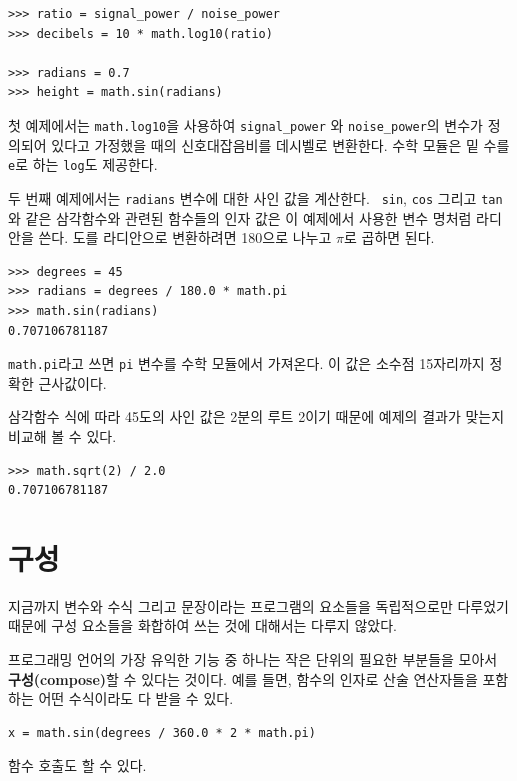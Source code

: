 \documentclass[10pt]{book}
\begin{document}
\begin{verbatim}
>>> ratio = signal_power / noise_power
>>> decibels = 10 * math.log10(ratio)

>>> radians = 0.7
>>> height = math.sin(radians)
\end{verbatim}
%
첫 예제에서는 \verb"math.log10"을 사용하여 \verb"signal_power" 와
\verb"noise_power"의 변수가 정의되어 있다고 가정했을 때의 신호대잡음비를
데시벨로 변환한다.  수학 모듈은 밑 수를 {\tt e}로 하는 {\tt log}도 제공한다. 

두 번째 예제에서는 {\tt radians} 변수에 대한 사인 값을 계산한다.  {\tt
  sin}, {\tt cos} 그리고 {\tt tan}와 같은 삼각함수와 관련된 함수들의
인자 값은 이 예제에서 사용한 변수 명처럼 라디안을 쓴다.  도를
라디안으로 변환하려면 180으로 나누고 $\pi$로 곱하면 된다.


\begin{verbatim}
>>> degrees = 45
>>> radians = degrees / 180.0 * math.pi
>>> math.sin(radians)
0.707106781187
\end{verbatim}
%
{\tt math.pi}라고 쓰면 {\tt pi} 변수를 수학 모듈에서 가져온다.  이 값은
소수점 15자리까지 정확한 근사값이다.

삼각함수 식에 따라 45도의 사인 값은 2분의 루트 2이기 때문에 예제의
결과가 맞는지 비교해 볼 수 있다.

\begin{verbatim}
>>> math.sqrt(2) / 2.0
0.707106781187
\end{verbatim}
%

\section{구성}

지금까지 변수와 수식 그리고 문장이라는 프로그램의 요소들을 독립적으로만
다루었기 때문에 구성 요소들을 화합하여 쓰는 것에 대해서는 다루지
않았다. 

프로그래밍 언어의 가장 유익한 기능 중 하나는 작은 단위의 필요한
부분들을 모아서 {\bf 구성(compose)}할 수 있다는 것이다.  예를 들면,
함수의 인자로 산술 연산자들을 포함하는 어떤 수식이라도 다 받을 수 있다. 


\begin{verbatim}
x = math.sin(degrees / 360.0 * 2 * math.pi)
\end{verbatim}
%
함수 호출도 할 수 있다. 
\end{document}
